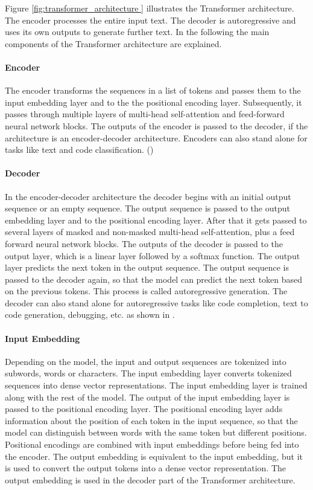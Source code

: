 Figure \ref{fig:transformer_architecture } illustrates the Transformer architecture. The encoder processes the entire input text. The decoder is autoregressive and uses its own outputs to generate further text. In the following the main components of the Transformer architecture are explained.

\paragraph{Encoder}

The encoder transforms the sequences in a list of tokens and passes them to the input embedding layer and to the the positional encoding layer. Subsequently, it passes through multiple layers of multi-head self-attention and feed-forward neural network blocks. The outputs of the encoder is passed to the decoder, if the architecture is an encoder-decoder architecture. Encoders can also stand alone for tasks like text and code classification. (\citet{Hou.8212023})

\paragraph{Decoder}

In the encoder-decoder architecture the decoder begins with an initial output sequence or an empty sequence. The output sequence is passed to the output embedding layer and to the positional encoding layer. After that it gets passed to several layers of masked and non-masked multi-head self-attention, plus a feed forward neural network blocks. The outputs of the decoder is passed to the output layer, which is a linear layer followed by a softmax function. The output layer predicts the next token in the output sequence. The output sequence is passed to the decoder again, so that the model can predict the next token based on the previous tokens. This process is called autoregressive generation.
The decoder can also stand alone for autoregressive tasks like code completion, text to code generation, debugging, etc. as shown in \citet{Hou.8212023}.

\paragraph{Input Embedding}
Depending on the model, the input and output sequences are tokenized into subwords, words or characters. The input embedding layer converts tokenized sequences into dense vector representations. The input embedding layer is trained along with the rest of the model. The output of the input embedding layer is passed to the positional encoding layer. The positional encoding layer adds information about the position of each token in the input sequence, so that the model can distinguish between words with the same token but different positions. Positional encodings are combined with input embeddings before being fed into the encoder. The output embedding is equivalent to the input embedding, but it is used to convert the output tokens into a dense vector representation. The output embedding is used in the decoder part of the Transformer architecture.

